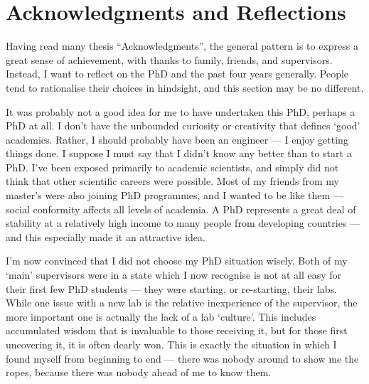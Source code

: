 

\bigskip

\begingroup
\let\clearpage\relax
\let\cleardoublepage\relax
\let\cleardoublepage\relax
\chapter*{Acknowledgments and Reflections}

Having read many thesis ``Acknowledgments'', the general pattern is to express a great sense of achievement, with thanks to family, friends, and supervisors.
Instead, I want to reflect on the PhD and the past four years generally.
People tend to rationalise their choices in hindsight, and this section may be no different.

It was probably not a good idea for me to have undertaken this PhD, perhaps a PhD at all.
I don't have the unbounded curiosity or creativity that defines `good' academics.
Rather, I should probably have been an engineer --- I enjoy getting things done.
I suppose I must say that I didn't know any better than to start a PhD. 
I've been exposed primarily to academic scientists, and simply did not think that other scientific careers were possible.
Most of my friends from my master's were also joining PhD programmes, and I wanted to be like them --- social conformity affects all levels of academia.
A PhD represents a great deal of stability at a relatively high income to many people from developing countries --- and this especially made it an attractive idea.

I'm now convinced that I did not choose my PhD situation wisely.
Both of my `main' supervisors were in a state which I now recognise is not at all easy for their first few PhD students --- they were starting, or re-starting, their labs.
While one issue with a new lab is the relative inexperience of the supervisor, the more important one is actually the lack of a lab `culture'.
This includes accumulated wisdom that is invaluable to those receiving it, but for those first uncovering it, it is often dearly won.
This is exactly the situation in which I found myself from beginning to end --- there was nobody around to show me the ropes, because there was nobody ahead of me to know them.



